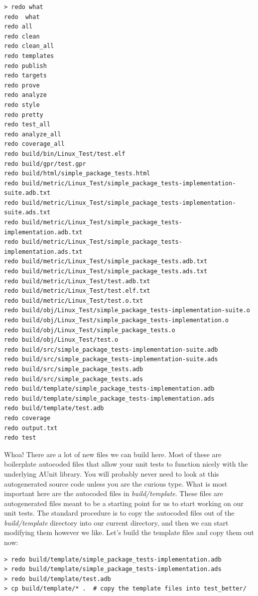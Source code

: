 \vspace{5mm} %
\begin{verbatim}
> redo what
redo  what
redo all
redo clean
redo clean_all
redo templates
redo publish
redo targets
redo prove
redo analyze
redo style
redo pretty
redo test_all
redo analyze_all
redo coverage_all
redo build/bin/Linux_Test/test.elf
redo build/gpr/test.gpr
redo build/html/simple_package_tests.html
redo build/metric/Linux_Test/simple_package_tests-implementation-suite.adb.txt
redo build/metric/Linux_Test/simple_package_tests-implementation-suite.ads.txt
redo build/metric/Linux_Test/simple_package_tests-implementation.adb.txt
redo build/metric/Linux_Test/simple_package_tests-implementation.ads.txt
redo build/metric/Linux_Test/simple_package_tests.adb.txt
redo build/metric/Linux_Test/simple_package_tests.ads.txt
redo build/metric/Linux_Test/test.adb.txt
redo build/metric/Linux_Test/test.elf.txt
redo build/metric/Linux_Test/test.o.txt
redo build/obj/Linux_Test/simple_package_tests-implementation-suite.o
redo build/obj/Linux_Test/simple_package_tests-implementation.o
redo build/obj/Linux_Test/simple_package_tests.o
redo build/obj/Linux_Test/test.o
redo build/src/simple_package_tests-implementation-suite.adb
redo build/src/simple_package_tests-implementation-suite.ads
redo build/src/simple_package_tests.adb
redo build/src/simple_package_tests.ads
redo build/template/simple_package_tests-implementation.adb
redo build/template/simple_package_tests-implementation.ads
redo build/template/test.adb
redo coverage
redo output.txt
redo test
\end{verbatim}
\vspace{5mm} %

Whoa! There are a lot of new files we can build here. Most of these are boilerplate autocoded files that allow your unit tests to function nicely with the underlying AUnit library. You will probably never need to look at this autogenerated source code unless you are the curious type. What is most important here are the autocoded files in \textit{build/template}. These files are autogenerated files meant to be a starting point for us to start working on our unit tests. The standard procedure is to copy the autocoded files out of the \textit{build/template} directory into our current directory, and then we can start modifying them however we like. Let's build the template files and copy them out now:

\vspace{5mm} %
\begin{verbatim}
> redo build/template/simple_package_tests-implementation.adb
> redo build/template/simple_package_tests-implementation.ads
> redo build/template/test.adb
> cp build/template/* .  # copy the template files into test_better/
\end{verbatim}
\vspace{5mm} %

